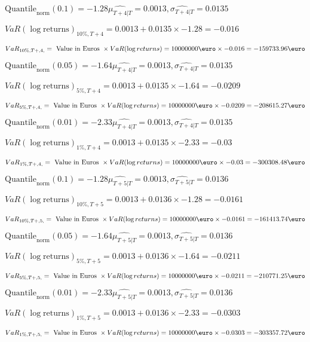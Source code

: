 $\text{Quantile}_\text{norm}(0.1) = -1.28$$\hat{\mu_{T+4|T}} = 0.0013, \hat{\sigma_{T+4|T}} = 0.0135$

$VaR(\log \text{returns})_{10\%, T + 4} = 0.0013 + 0.0135\times-1.28 = -0.016$

$VaR_{10\%, T + ,4,} = \text{ Value in Euros } \times VaR(\log returns) = 10 000 000 \text{\euro} \times-0.016 = -159733.96 \text{\euro}$


$\text{Quantile}_\text{norm}(0.05) = -1.64$$\hat{\mu_{T+4|T}} = 0.0013, \hat{\sigma_{T+4|T}} = 0.0135$

$VaR(\log \text{returns})_{5\%, T + 4} = 0.0013 + 0.0135\times-1.64 = -0.0209$

$VaR_{5\%, T + ,4,} = \text{ Value in Euros } \times VaR(\log returns) = 10 000 000 \text{\euro} \times-0.0209 = -208615.27 \text{\euro}$


$\text{Quantile}_\text{norm}(0.01) = -2.33$$\hat{\mu_{T+4|T}} = 0.0013, \hat{\sigma_{T+4|T}} = 0.0135$

$VaR(\log \text{returns})_{1\%, T + 4} = 0.0013 + 0.0135\times-2.33 = -0.03$

$VaR_{1\%, T + ,4,} = \text{ Value in Euros } \times VaR(\log returns) = 10 000 000 \text{\euro} \times-0.03 = -300308.48 \text{\euro}$


$\text{Quantile}_\text{norm}(0.1) = -1.28$$\hat{\mu_{T+5|T}} = 0.0013, \hat{\sigma_{T+5|T}} = 0.0136$

$VaR(\log \text{returns})_{10\%, T + 5} = 0.0013 + 0.0136\times-1.28 = -0.0161$

$VaR_{10\%, T + ,5,} = \text{ Value in Euros } \times VaR(\log returns) = 10 000 000 \text{\euro} \times-0.0161 = -161413.74 \text{\euro}$


$\text{Quantile}_\text{norm}(0.05) = -1.64$$\hat{\mu_{T+5|T}} = 0.0013, \hat{\sigma_{T+5|T}} = 0.0136$

$VaR(\log \text{returns})_{5\%, T + 5} = 0.0013 + 0.0136\times-1.64 = -0.0211$

$VaR_{5\%, T + ,5,} = \text{ Value in Euros } \times VaR(\log returns) = 10 000 000 \text{\euro} \times-0.0211 = -210771.25 \text{\euro}$


$\text{Quantile}_\text{norm}(0.01) = -2.33$$\hat{\mu_{T+5|T}} = 0.0013, \hat{\sigma_{T+5|T}} = 0.0136$

$VaR(\log \text{returns})_{1\%, T + 5} = 0.0013 + 0.0136\times-2.33 = -0.0303$

$VaR_{1\%, T + ,5,} = \text{ Value in Euros } \times VaR(\log returns) = 10 000 000 \text{\euro} \times-0.0303 = -303357.72 \text{\euro}$


